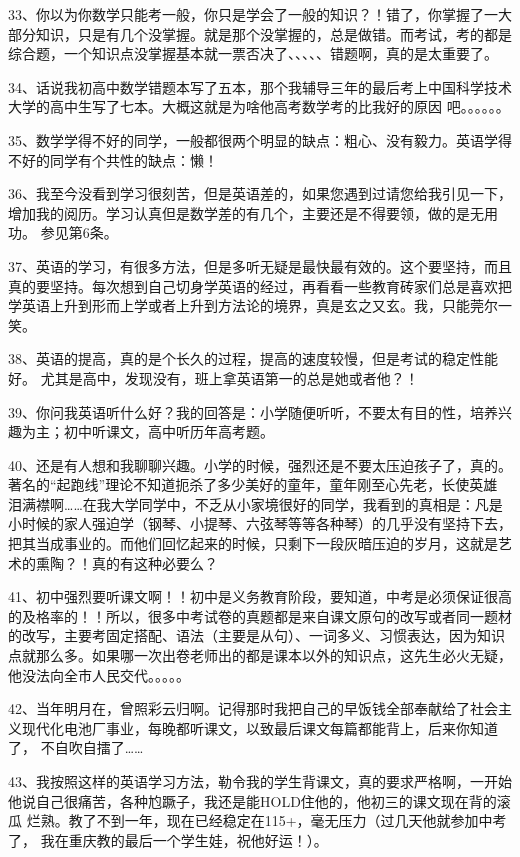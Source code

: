\documentclass[11pt]{ctexart}
\begin{document}
{{{{33、你以为你数学只能考一般，你只是学会了一般的知识？！错了，你掌握了一大
部分知识，只是有几个没掌握。就是那个没掌握的，总是做错。而考试，考的都是
综合题，一个知识点没掌握基本就一票否决了、、、、、错题啊，真的是太重要了。


34、话说我初高中数学错题本写了五本，那个我辅导三年的最后考上中国科学技术
大学的高中生写了七本。大概这就是为啥他高考数学考的比我好的原因
吧。。。。。。


35、数学学得不好的同学，一般都很两个明显的缺点：粗心、没有毅力。英语学得
不好的同学有个共性的缺点：懒！


36、我至今没看到学习很刻苦，但是英语差的，如果您遇到过请您给我引见一下，
增加我的阅历。学习认真但是数学差的有几个，主要还是不得要领，做的是无用功。
参见第6条。


37、英语的学习，有很多方法，但是多听无疑是最快最有效的。这个要坚持，而且
真的要坚持。每次想到自己切身学英语的经过，再看看一些教育砖家们总是喜欢把
学英语上升到形而上学或者上升到方法论的境界，真是玄之又玄。我，只能莞尔一
笑。


38、英语的提高，真的是个长久的过程，提高的速度较慢，但是考试的稳定性能好。
尤其是高中，发现没有，班上拿英语第一的总是她或者他？！


39、你问我英语听什么好？我的回答是：小学随便听听，不要太有目的性，培养兴
趣为主；初中听课文，高中听历年高考题。


40、还是有人想和我聊聊兴趣。小学的时候，强烈还是不要太压迫孩子了，真的。
著名的“起跑线”理论不知道扼杀了多少美好的童年，童年刚至心先老，长使英雄
泪满襟啊……在我大学同学中，不乏从小家境很好的同学，我看到的真相是：凡是
小时候的家人强迫学（钢琴、小提琴、六弦琴等等各种琴）的几乎没有坚持下去，
把其当成事业的。而他们回忆起来的时候，只剩下一段灰暗压迫的岁月，这就是艺
术的熏陶？！真的有这种必要么？


41、初中强烈要听课文啊！！初中是义务教育阶段，要知道，中考是必须保证很高
的及格率的！！所以，很多中考试卷的真题都是来自课文原句的改写或者同一题材
的改写，主要考固定搭配、语法（主要是从句）、一词多义、习惯表达，因为知识
点就那么多。如果哪一次出卷老师出的都是课本以外的知识点，这先生必火无疑，
他没法向全市人民交代。。。。。


42、当年明月在，曾照彩云归啊。记得那时我把自己的早饭钱全部奉献给了社会主
义现代化电池厂事业，每晚都听课文，以致最后课文每篇都能背上，后来你知道了，
不自吹自擂了……


43、我按照这样的英语学习方法，勒令我的学生背课文，真的要求严格啊，一开始
他说自己很痛苦，各种尥蹶子，我还是能HOLD住他的，他初三的课文现在背的滚瓜
烂熟。教了不到一年，现在已经稳定在115+，毫无压力（过几天他就参加中考了，
我在重庆教的最后一个学生娃，祝他好运！）。


}}}}
\end{document}
